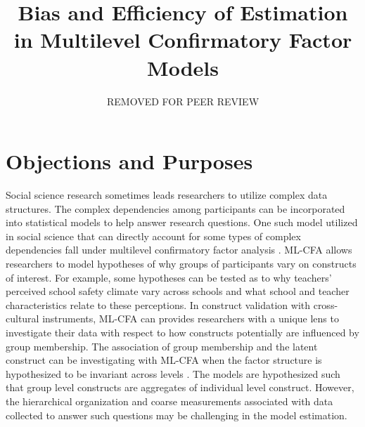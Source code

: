 \documentclass[man, noextraspace, 12pt]{apa7}
\title{Bias and Efficiency of Estimation in Multilevel Confirmatory Factor Models}
\author{REMOVED FOR PEER REVIEW}
\affiliation{REMOVED FOR PEER REVIEW}
\begin{document}
\maketitle

\setlength{\abovedisplayskip}{3pt}
\setlength{\belowdisplayskip}{3pt}

\section{Objections and Purposes}

Social science research sometimes leads researchers to utilize complex data structures.
The complex dependencies among participants can be incorporated into statistical models to help answer research questions.
One such model utilized in social science that can directly account for some types of complex dependencies fall under multilevel confirmatory factor analysis \citep[ML-CFA,][]{Goldstein1988, Muthen1994}.
ML-CFA allows researchers to model hypotheses of why groups of participants vary on constructs of interest.
For example, some hypotheses can be tested as to why teachers' perceived school safety climate vary across schools and what school and teacher characteristics relate to these perceptions.
In construct validation with cross-cultural instruments, ML-CFA can provides researchers with a unique lens to investigate their data with respect to how constructs potentially are influenced by group membership.
The association of group membership and the latent construct can be investigating with ML-CFA when the factor structure is hypothesized to be invariant across levels \citep[][Models 4-5, pg. 488]{Stapleton2016}.
The models are hypothesized such that group level constructs are aggregates of individual level construct.
However, the hierarchical organization and coarse measurements associated with data collected to answer such questions may be challenging in the model estimation.
\end{document}
